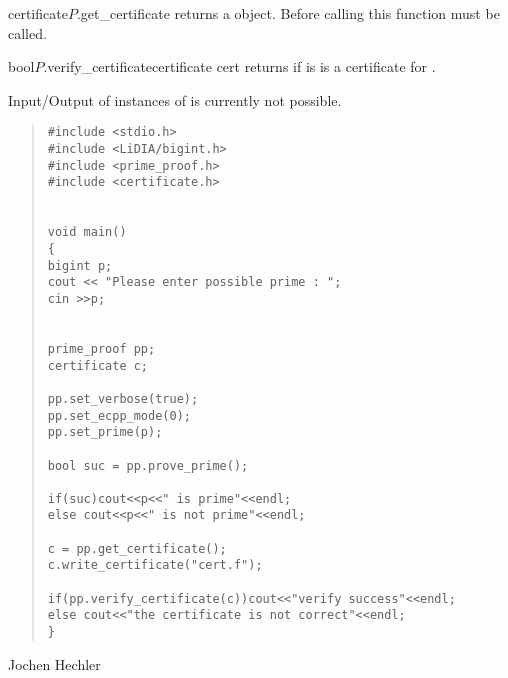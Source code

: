 \begin{cfcode}{certificate}{$P$.get_certificate}{}
        returns a  object.
        Before calling this function  must be called.
\end{cfcode}
\begin{cfcode}{bool}{$P$.verify_certificate}{certificate cert}
        returns  if  is is a certificate for .
\end{cfcode}


\IO

Input/Output of instances of  is currently not possible.



\SEEALSO




\EXAMPLES
\begin{quote}
\begin{verbatim}
#include <stdio.h>
#include <LiDIA/bigint.h>
#include <prime_proof.h>
#include <certificate.h>


void main()
{
bigint p;
cout << "Please enter possible prime : "; 
cin >>p;


prime_proof pp;
certificate c;

pp.set_verbose(true);
pp.set_ecpp_mode(0);
pp.set_prime(p);

bool suc = pp.prove_prime();

if(suc)cout<<p<<" is prime"<<endl;
else cout<<p<<" is not prime"<<endl;

c = pp.get_certificate();
c.write_certificate("cert.f");

if(pp.verify_certificate(c))cout<<"verify success"<<endl;
else cout<<"the certificate is not correct"<<endl;
}
\end{verbatim}
\end{quote}



\AUTHOR

Jochen Hechler

